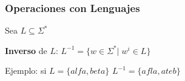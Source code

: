 \begin{frame}
  \frametitle{Operaciones con Lenguajes}
      Sea $L \subseteq \Sigma^*$
      \begin{defi}
			\textbf{Inverso} de $L$: $L^{-1} = \{w \in \Sigma^*| \; w^i \in L \}$
      \end{defi}

			\pause
      \begin{block}{Ejemplo: si $L=\{alfa, beta\}$}
			$L^{-1} = \{ afla, ateb \}$
      \end{block}
\end{frame}

